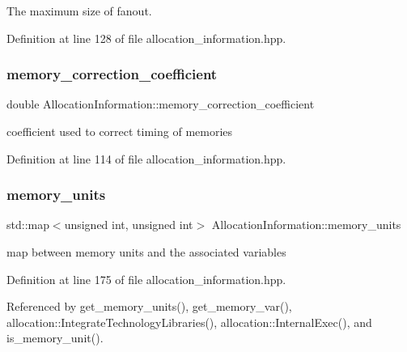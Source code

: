 The maximum size of fanout. 



Definition at line 128 of file allocation\+\_\+information.\+hpp.

\mbox{\label{classAllocationInformation_afb748de8a2e27b3421e7cef5aee235f0}} 
\subsubsection{\texorpdfstring{memory\+\_\+correction\+\_\+coefficient}{memory\_correction\_coefficient}}
{\footnotesize\ttfamily double Allocation\+Information\+::memory\+\_\+correction\+\_\+coefficient\hspace{0.3cm}{\ttfamily [private]}}



coefficient used to correct timing of memories 



Definition at line 114 of file allocation\+\_\+information.\+hpp.

\mbox{\label{classAllocationInformation_a09a1bd53db3029f3b557ce607d1ff547}} 
\subsubsection{\texorpdfstring{memory\+\_\+units}{memory\_units}}
{\footnotesize\ttfamily std\+::map$<$unsigned int, unsigned int$>$ Allocation\+Information\+::memory\+\_\+units\hspace{0.3cm}{\ttfamily [private]}}



map between memory units and the associated variables 



Definition at line 175 of file allocation\+\_\+information.\+hpp.



Referenced by get\+\_\+memory\+\_\+units(), get\+\_\+memory\+\_\+var(), allocation\+::\+Integrate\+Technology\+Libraries(), allocation\+::\+Internal\+Exec(), and is\+\_\+memory\+\_\+unit().

